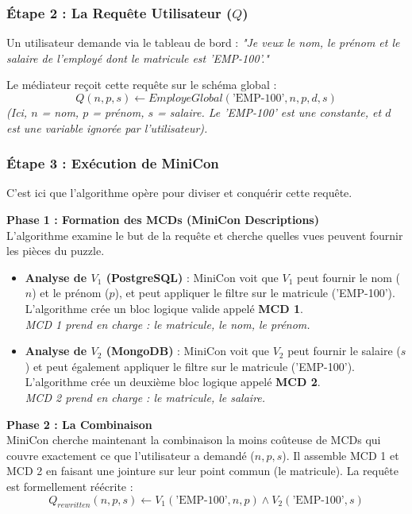 \documentclass[11pt,a4paper]{article}
\begin{document}
\subsubsection{Étape 2 : La Requête Utilisateur ($Q$)}
Un utilisateur demande via le tableau de bord : \textit{"Je veux le nom, le prénom et le salaire de l'employé dont le matricule est 'EMP-100'."}

Le médiateur reçoit cette requête sur le schéma global :
\begin{equation}
Q(n, p, s) \leftarrow EmployeGlobal(\text{'EMP-100'}, n, p, d, s)
\end{equation}
\textit{(Ici, $n$ = nom, $p$ = prénom, $s$ = salaire. Le 'EMP-100' est une constante, et $d$ est une variable ignorée par l'utilisateur).}

\subsubsection{Étape 3 : Exécution de MiniCon}
C'est ici que l'algorithme opère pour diviser et conquérir cette requête.

\textbf{Phase 1 : Formation des MCDs (MiniCon Descriptions)} \\
L'algorithme examine le but de la requête et cherche quelles vues peuvent fournir les pièces du puzzle.
\begin{itemize}
    \item \textbf{Analyse de $V_1$ (PostgreSQL)} : MiniCon voit que $V_1$ peut fournir le nom ($n$) et le prénom ($p$), et peut appliquer le filtre sur le matricule ('EMP-100'). L'algorithme crée un bloc logique valide appelé \textbf{MCD 1}. \\
    \textit{MCD 1 prend en charge : le matricule, le nom, le prénom.}
    \item \textbf{Analyse de $V_2$ (MongoDB)} : MiniCon voit que $V_2$ peut fournir le salaire ($s$) et peut également appliquer le filtre sur le matricule ('EMP-100'). L'algorithme crée un deuxième bloc logique appelé \textbf{MCD 2}. \\
    \textit{MCD 2 prend en charge : le matricule, le salaire.}
\end{itemize}

\textbf{Phase 2 : La Combinaison} \\
MiniCon cherche maintenant la combinaison la moins coûteuse de MCDs qui couvre exactement ce que l'utilisateur a demandé ($n, p, s$). Il assemble MCD 1 et MCD 2 en faisant une jointure sur leur point commun (le matricule).
La requête est formellement réécrite :
\begin{equation}
Q_{rewritten}(n, p, s) \leftarrow V_1(\text{'EMP-100'}, n, p) \wedge V_2(\text{'EMP-100'}, s)
\end{equation}
\end{document}
